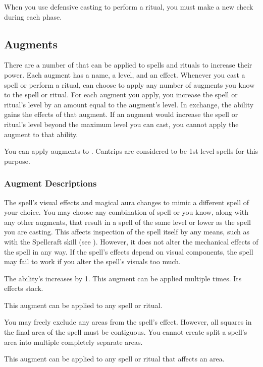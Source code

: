             When you use defensive casting to perform a ritual, you must make a new check during each phase.

    \subsection{Augments}\label{Augments}
        There are a number of  that can be applied to spells and rituals to increase their power.
        Each augment has a name, a level, and an effect.
        Whenever you cast a spell or perform a ritual, can choose to apply any number of augments you know to the spell or ritual.
        For each augment you apply, you increase the spell or ritual's level by an amount equal to the augment's level.
        In exchange, the ability gains the effects of that augment.
        If an augment would increase the spell or ritual's level beyond the maximum level you can cast, you cannot apply the augment to that ability.

        You can apply augments to .
        Cantrips are considered to be 1st level spells for this purpose.

        \subsubsection{Augment Descriptions}\label{Augment Descriptions}

             The spell's visual effects and magical aura changes to mimic a different spell of your choice.
            You may choose any combination of spell or  you know, along with any other augments, that result in a spell of the same level or lower as the spell you are casting.
            This affects inspection of the spell itself by any means, such as with the Spellcraft skill (see ).
            However, it does not alter the mechanical effects of the spell in any way.
            If the spell's effects depend on visual components, the spell may fail to work if you alter the spell's visuals too much. 

             The ability's  increases by 1.
            This augment can be applied multiple times.
            Its effects stack.
            \par This augment can be applied to any spell or ritual.

             You may freely exclude any areas from the spell's effect.
            However, all squares in the final area of the spell must be contiguous.
            You cannot create split a spell's area into multiple completely separate areas.
            \par This augment can be applied to any spell or ritual that affects an area.


